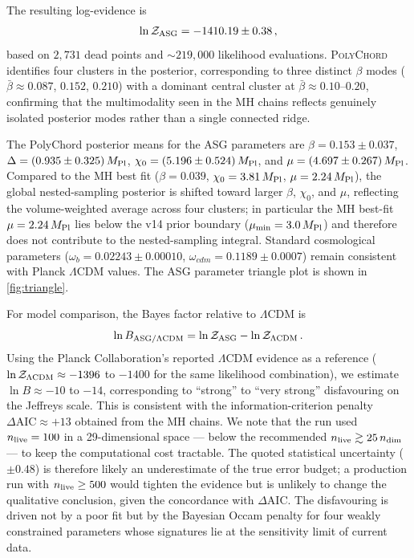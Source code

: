 \documentclass[11pt,a4paper]{article}
\begin{document}
The resulting log-evidence is
\begin{equation}
\ln\mathcal{Z}_{\rm ASG}=-1410.19\pm0.38\,,
\label{eq:lnZ}
\end{equation}
based on $2{,}731$ dead points and ${\sim}219{,}000$ likelihood evaluations. \textsc{PolyChord} identifies four clusters in the posterior, corresponding to three distinct $\beta$ modes ($\bar\beta\approx0.087$, $0.152$, $0.210$) with a dominant central cluster at $\bar\beta\approx0.10$--$0.20$, confirming that the multimodality seen in the MH chains reflects genuinely isolated posterior modes rather than a single connected ridge.

The PolyChord posterior means for the ASG parameters are $\beta=0.153\pm0.037$, $\Delta=(0.935\pm0.325)\,M_{\rm Pl}$, $\chi_0=(5.196\pm0.524)\,M_{\rm Pl}$, and $\mu=(4.697\pm0.267)\,M_{\rm Pl}$. Compared to the MH best fit ($\beta=0.039$, $\chi_0=3.81\,M_{\rm Pl}$, $\mu=2.24\,M_{\rm Pl}$), the global nested-sampling posterior is shifted toward larger $\beta$, $\chi_0$, and $\mu$, reflecting the volume-weighted average across four clusters; in particular the MH best-fit $\mu=2.24\,M_{\rm Pl}$ lies below the v14 prior boundary ($\mu_{\min}=3.0\,M_{\rm Pl}$) and therefore does not contribute to the nested-sampling integral. Standard cosmological parameters ($\omega_b=0.02243\pm0.00010$, $\omega_{cdm}=0.1189\pm0.0007$) remain consistent with Planck $\Lambda$CDM values. The ASG parameter triangle plot is shown in \cref{fig:triangle}.

For model comparison, the Bayes factor relative to $\Lambda$CDM is
\begin{equation}
\ln B_{\rm ASG/\Lambda CDM}=\ln\mathcal{Z}_{\rm ASG}-\ln\mathcal{Z}_{\Lambda\rm CDM}\,.
\end{equation}
Using the Planck Collaboration's reported $\Lambda$CDM evidence as a reference ($\ln\mathcal{Z}_{\Lambda\rm CDM}\approx-1396$ to $-1400$ for the same likelihood combination), we estimate $\ln B\approx-10$ to $-14$, corresponding to ``strong'' to ``very strong'' disfavouring on the Jeffreys scale. This is consistent with the information-criterion penalty $\Delta\text{AIC}\approx+13$ obtained from the MH chains. We note that the run used $n_{\rm live}=100$ in a 29-dimensional space --- below the recommended $n_{\rm live}\gtrsim25\,n_{\rm dim}$ --- to keep the computational cost tractable. The quoted statistical uncertainty ($\pm0.48$) is therefore likely an underestimate of the true error budget; a production run with $n_{\rm live}\ge500$ would tighten the evidence but is unlikely to change the qualitative conclusion, given the concordance with $\Delta\text{AIC}$. The disfavouring is driven not by a poor fit but by the Bayesian Occam penalty for four weakly constrained parameters whose signatures lie at the sensitivity limit of current data.
\end{document}
